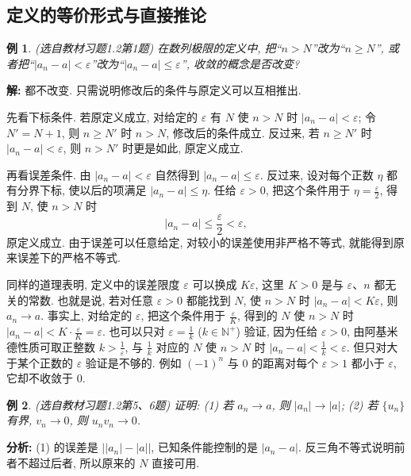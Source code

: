 \documentclass[UTF8,openany]{ctexbook}
\theoremstyle{chinesetextbook}
\newtheorem{example}{例}[section]
\newenvironment{cnsolution}{\par\indent\textbf{解:} \ignorespaces}{\par}
\begin{document}
\subsection{定义的等价形式与直接推论}
\begin{example}
\textnormal{(选自教材习题1.2第1题)} 在数列极限的定义中, 把“$n>N$”改为“$n\ge N$”, 或者把“$|a_n-a|<\varepsilon$”改为“$|a_n-a|\le\varepsilon$”, 收敛的概念是否改变?
\end{example}
\begin{cnsolution}
都不改变. 只需说明修改后的条件与原定义可以互相推出.

先看下标条件. 若原定义成立, 对给定的 $\varepsilon$ 有 $N$ 使 $n>N$ 时 $|a_n-a|<\varepsilon$; 令 $N'=N+1$, 则 $n\ge N'$ 时 $n>N$, 修改后的条件成立. 反过来, 若 $n\ge N'$ 时 $|a_n-a|<\varepsilon$, 则 $n>N'$ 时更是如此, 原定义成立.

再看误差条件. 由 $|a_n-a|<\varepsilon$ 自然得到 $|a_n-a|\le\varepsilon$. 反过来, 设对每个正数 $\eta$ 都有分界下标, 使以后的项满足 $|a_n-a|\le\eta$. 任给 $\varepsilon>0$, 把这个条件用于 $\displaystyle\eta=\frac\varepsilon2$, 得到 $N$, 使 $n>N$ 时
\[
|a_n-a|\le\frac\varepsilon2<\varepsilon,
\]
原定义成立. 由于误差可以任意给定, 对较小的误差使用非严格不等式, 就能得到原来误差下的严格不等式.
\end{cnsolution}
同样的道理表明, 定义中的误差限度 $\varepsilon$ 可以换成 $K\varepsilon$, 这里 $K>0$ 是与 $\varepsilon$、$n$ 都无关的常数. 也就是说, 若对任意 $\varepsilon>0$ 都能找到 $N$, 使 $n>N$ 时 $|a_n-a|<K\varepsilon$, 则 $a_n\to a$. 事实上, 对给定的 $\varepsilon$, 把这个条件用于 $\displaystyle\frac\varepsilon K$, 得到的 $N$ 使 $n>N$ 时 $\displaystyle|a_n-a|<K\cdot\frac\varepsilon K=\varepsilon$. 也可以只对 $\displaystyle\varepsilon=\frac1k$ ($k\in\mathbb N^+$) 验证, 因为任给 $\varepsilon>0$, 由阿基米德性质可取正整数 $\displaystyle k>\frac1\varepsilon$, 与 $\displaystyle\frac1k$ 对应的 $N$ 使 $n>N$ 时 $\displaystyle|a_n-a|<\frac1k<\varepsilon$. 但只对大于某个正数的 $\varepsilon$ 验证是不够的. 例如 $(-1)^n$ 与 $0$ 的距离对每个 $\varepsilon>1$ 都小于 $\varepsilon$, 它却不收敛于 $0$.
\begin{example}
\textnormal{(选自教材习题1.2第5、6题)} 证明: (1) 若 $a_n\to a$, 则 $|a_n|\to|a|$; (2) 若 $\{u_n\}$ 有界, $v_n\to0$, 则 $u_nv_n\to0$.
\end{example}
\par\indent\textbf{分析:} (1) 的误差是 $\bigl||a_n|-|a|\bigr|$, 已知条件能控制的是 $|a_n-a|$. 反三角不等式说明前者不超过后者, 所以原来的 $N$ 直接可用.
\end{document}
